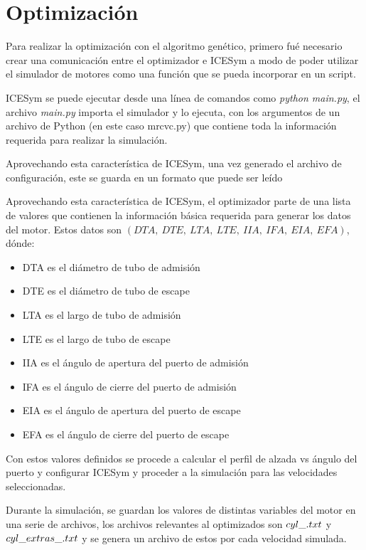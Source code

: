 \chapter{Optimización}

Para realizar la optimización con el algoritmo genético, primero fué necesario
crear una comunicación entre el optimizador e ICESym a modo de poder utilizar
el simulador de motores como una función que se pueda incorporar en un script.

ICESym se puede ejecutar desde una línea de comandos como \emph{python
main.py}, el archivo \emph{main.py} importa el simulador y lo ejecuta, con los
argumentos de un archivo de Python (en este caso mrcvc.py) que contiene toda la
información requerida para realizar la simulación.

Aprovechando esta característica de ICESym, una vez generado el archivo de
configuración, este se guarda en un formato que puede ser leído

Aprovechando esta característica de ICESym, el optimizador parte de una lista de
valores que contienen la información básica requerida para generar los datos del
motor.
%
Estos datos son \emph{$(DTA,\ DTE,\ LTA,\ LTE,\ IIA,\ IFA,\ EIA,\ EFA)$}, dónde:
%
\begin{itemize}
    \item DTA es el diámetro de tubo de admisión
    \item DTE es el diámetro de tubo de escape
    \item LTA es el largo de tubo de admisión
    \item LTE es el largo de tubo de escape
    \item IIA es el ángulo de apertura del puerto de admisión
    \item IFA es el ángulo de cierre del puerto de admisión
    \item EIA es el ángulo de apertura del puerto de escape
    \item EFA es el ángulo de cierre del puerto de escape
\end{itemize}
%

Con estos valores definidos se procede a calcular el perfil de alzada vs ángulo
del puerto y configurar ICESym y proceder a la simulación para las velocidades
seleccionadas.

Durante la simulación, se guardan los valores de distintas variables del motor
en una serie de archivos, los archivos relevantes al optimizados son
\emph{$cyl\_\*.txt$} y \emph{$cyl\_extras\_\*.txt$} y se genera un archivo de
estos por cada velocidad simulada.


